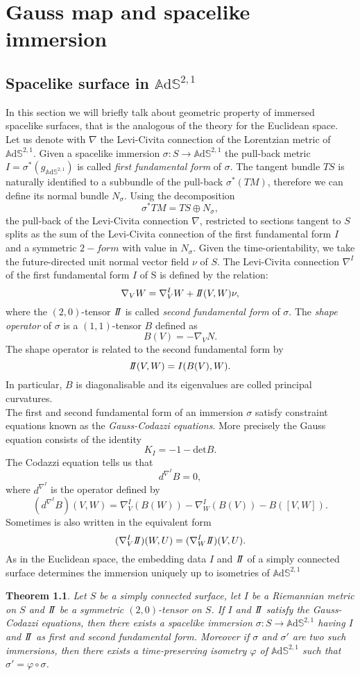 \documentclass[10pt,a4paper,oneside,reqno]{book}
\def\A{\mathbb{A}\mathrm{d}\mathbb{S}}
\newcommand{\I}{I}
\newcommand{\II}{I\hspace{-0.1cm}I}
\theoremstyle{plain}
\newtheorem{theorem}{Theorem}[chapter] %
\theoremstyle{definition}
\theoremstyle{plain}
\theoremstyle{plain}
\theoremstyle{mystyleNormalFont}
\begin{document}
\chapter{Gauss map and spacelike immersion}

\section{Spacelike surface in $\A^{2,1}$}
In this section we will briefly talk about geometric property of immersed spacelike surfaces, that is the analogous of the theory for the Euclidean space.\\
Let us denote with $\nabla$ the Levi-Civita connection of the Lorentzian metric of $\A^{2,1}$. Given a spacelike immersion $\sigma: S\to\A^{2,1}$ the pull-back metric $\I = \sigma^*(g_{\A^{2,1}})$ is called \textit{first fundamental form} of $\sigma$.
The tangent bundle $TS$ is naturally identified to a subbundle of the pull-back $\sigma^*(TM)$, therefore we can define its normal bundle $N_\sigma$. Using the decomposition
\[
    \sigma^* TM = TS \oplus N_\sigma,
\]
the pull-back of the Levi-Civita connection $\nabla$, restricted to sections tangent to $S$ splits as the sum of the Levi-Civita connection of the first fundamental form $\I$ and a symmetric $2-form$ with value in $N_\sigma$. Given the time-orientability, we take the future-directed unit normal vector field $\nu$ of $S$. The Levi-Civita connection $\nabla^\I$ of the first fundamental form $\I$ of S is defined by the relation:
\[
    \nabla_V W= \nabla^\I_V W + \II(V,W)\nu,
\] 
where the $(2,0)$-tensor $\II$ is called \textit{second fundamental form} of $\sigma$. The \textit{shape  operator} of $\sigma$ is a $(1,1)$-tensor $B$ defined as
\[
    B(V) = - \nabla_V N.
\]
The shape operator is related to the second fundamental form by
\[
    \II(V,W) = \I(B(V),W).
\]
In particular, $B$ is diagonalisable and its eigenvalues are colled principal curvatures.\\
The first and second fundamental form of an immersion $\sigma$ satisfy constraint equations known as the \textit{Gauss-Codazzi equations}. More precisely the Gauss equation consists of the identity
\[
    K_\I = -1 - \text{det}B.
\]
The Codazzi equation tells us that
\[
    d^{\nabla^\I}B=0,
\]
where $d^{\nabla^\I}$ is the operator defined by
\[
    (d^{\nabla^\I}B)(V,W) = \nabla^\I_V(B(W)) - \nabla^\I_W(B(V)) - B([V,W]).
\]
Sometimes is also written in the equivalent form 
\[
    (\nabla^\I_V \II)(W,U) = (\nabla^\I_W \II)(V,U).
\]
As in the Euclidean space, the embedding data $I$ and $\II$ of a simply connected surface determines the immersion uniquely up to isometries of $\A^{2,1}$
\begin{theorem}\label{thm:immersion of simply connected surface}
    Let $S$ be a simply connected surface, let $\I$ be a Riemannian metric on $S$ and $\II$ be a symmetric $(2,0)$-tensor on $S$. If $\I$ and $\II$ satisfy the Gauss-Codazzi equations, then there exists a spacelike immersion $\sigma:S \to\A^{2,1}$ having $\I$ and $\II$ as first and second fundamental form. Moreover if $\sigma$ and $\sigma'$ are two such immersions, then there exists a time-preserving isometry $\varphi$ of $\A^{2,1}$ such that $\sigma' = \varphi \circ \sigma$.
\end{theorem}
\end{document}

